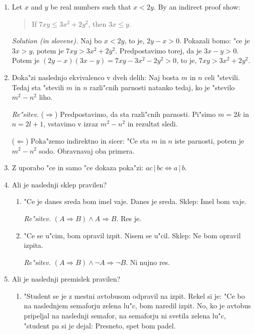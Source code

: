 \documentclass[11pt,paper=b5,footinclude,headinclude]{scrbook} %
\theoremstyle{remark}
\theoremstyle{definition} %
\theoremstyle{theorem} %
\begin{document}
\begin{enumerate}
\emph{ Re"sitev.} Nasporotna trdtev je: obstaja naravno "stevilo, ki je ve"cje od $1$.


\item Let  $x$ and $y$ be real numbers such that $x<2y$. 
By an indirect proof show: 
\begin{quote}
    If $7xy\leq 3x^2 + 2y^2$, then $3x\leq y$.
\end{quote}

\emph{ Solution (in slovene).} Naj bo $x<2y$, to je, $2y-x>0$. Pokazali bomo: "ce je $3x> y$, potem je $7xy > 3x^2 + 2y^2$. Predpostavimo torej, da je $3x-y>0$. Potem je $(2y-x)(3x-y)= 7xy - 3x^2 - 2y^2>0$, to je, $7xy > 3x^2 + 2y^2$.

\item Doka"zi naslednjo ekvivalenco v dveh delih: Naj bosta $m$ in $n$ celi "stevili. Tedaj sta "stevili $m$ in $n$ razli"cnih parnosti natanko tedaj, ko je "stevilo $m^2- n^2$ liho.

\emph{ Re"sitev.} ($\Rightarrow$) Predpostavimo, da sta razli"cnih parnosti. Pi"simo  $m=2k$ in $n=2l+1$, vstavimo v izraz $m^2- n^2$ in rezultat sledi.

($\Leftarrow$) Poka"zemo indirektno in sicer: "Ce sta $m$ in $n$ iste parnosti, potem je $m^2- n^2$ sodo. Obravnavaj oba primera.


\item Z uporabo "ce in samo "ce dokaza poka"zi: $ac\,|\,bc \Leftrightarrow a\,|\,b$.

\item Ali je naslednji sklep pravilen?
\begin{enumerate}
\item[(i)] "Ce je danes sreda bom imel vaje. Danes je sreda. Sklep: Imel bom vaje.

\emph{ Re"sitev.} $(A\Rightarrow B) \wedge A \Rightarrow B$. Res je.

\item[(ii)] "Ce se u"cim, bom opravil izpit. Nisem se u"cil. Sklep: Ne bom opravil izpita.

\emph{ Re"sitev.} $(A\Rightarrow B) \wedge \neg A \Rightarrow \neg B$. Ni nujno res.
\end{enumerate}

\item Ali je naslednji premislek pravilen?
\begin{enumerate}
\item[(i)] "Student se je z mestni avtobusom odpravil na izpit. Rekel si je: "Ce bo na naslednjem semaforju zelena lu"c, bom naredil izpit. No, ko je avtobus pripeljal na naslednji semafor, na semaforju ni svetila zelena lu"c, "student pa si je dejal: Presneto, spet bom padel.


\end{enumerate}
\end{enumerate}
\end{document}
